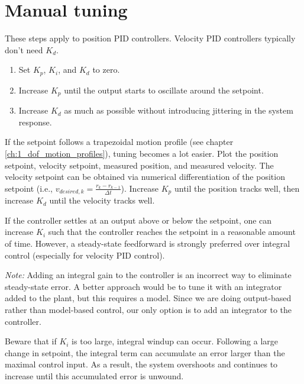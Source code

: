 \section{Manual tuning}

These steps apply to position PID controllers. Velocity PID controllers
typically don't need $K_d$.
\begin{enumerate}
  \item Set $K_p$, $K_i$, and $K_d$ to zero.
  \item Increase $K_p$ until the \gls{output} starts to oscillate around the
    \gls{setpoint}.
  \item Increase $K_d$ as much as possible without introducing jittering in the
    \gls{system response}.
\end{enumerate}

If the \gls{setpoint} follows a trapezoidal motion profile (see chapter
\ref{ch:1_dof_motion_profiles}), tuning becomes a lot easier. Plot the position
\gls{setpoint}, velocity \gls{setpoint}, measured position, and measured
velocity. The velocity \gls{setpoint} can be obtained via numerical
differentiation of the position \gls{setpoint} (i.e.,
$v_{desired,k} = \frac{r_k - r_{k-1}}{\Delta t}$). Increase $K_p$ until the
position tracks well, then increase $K_d$ until the velocity tracks well.

If the \gls{controller} settles at an \gls{output} above or below the
\gls{setpoint}, one can increase $K_i$ such that the \gls{controller} reaches
the \gls{setpoint} in a reasonable amount of time. However, a steady-state
feedforward is strongly preferred over integral control (especially for velocity
PID control).
\begin{remark}
  \textit{Note:} Adding an integral gain to the \gls{controller} is an incorrect
  way to eliminate \gls{steady-state error}. A better approach would be to tune
  it with an integrator added to the \gls{plant}, but this requires a
  \gls{model}. Since we are doing output-based rather than model-based control,
  our only option is to add an integrator to the \gls{controller}.
\end{remark}

Beware that if $K_i$ is too large, integral windup can occur. Following a large
change in \gls{setpoint}, the integral term can accumulate an error larger than
the maximal \gls{control input}. As a result, the system overshoots and
continues to increase until this accumulated error is unwound.
